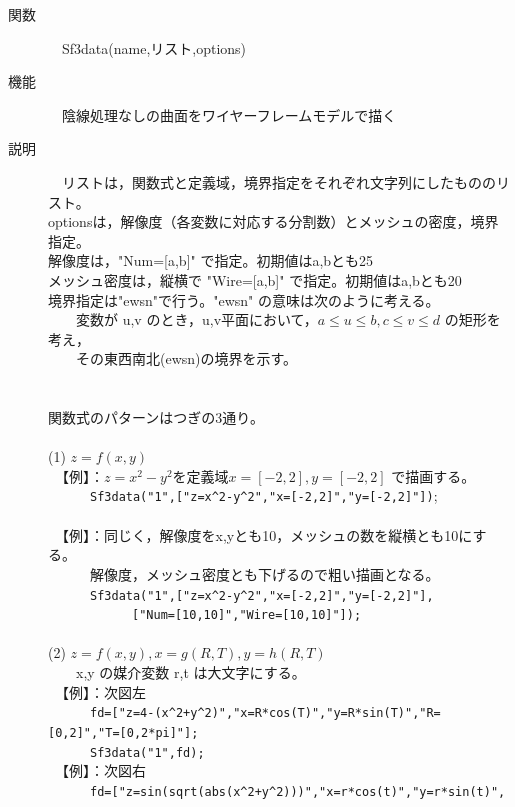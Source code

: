 \documentclass[papersize,a4paper,12pt,uplatex]{jsarticle}
\begin{document}
\begin{description}
\hypertarget{sf3data}{}
\item[関数]　Sf3data(name,リスト,options)
\item[機能]　陰線処理なしの曲面をワイヤーフレームモデルで描く
\item[説明]　リストは，関数式と定義域，境界指定をそれぞれ文字列にしたもののリスト。\\
optionsは，解像度（各変数に対応する分割数）とメッシュの密度，境界指定。\\
解像度は，"Num=[a,b]" で指定。初期値はa,bとも25\\
メッシュ密度は，縦横で "Wire=[a,b]" で指定。初期値はa,bとも20\\
境界指定は"ewsn"で行う。"ewsn" の意味は次のように考える。\\
　　変数が u,v のとき，u,v平面において，$a \leq u \leq b,c \leq v \leq d$ の矩形を考え，\\
　　その東西南北(ewsn)の境界を示す。\\
　　　　　　　　\\
　\\
関数式のパターンはつぎの3通り。\\
　\\
(1) $z=f(x,y)$\\
　【例】：$z=x^2-y^2$を定義域$x=[-2,2],y=[-2,2]$ で描画する。\\
　　　\verb|Sf3data("1",["z=x^2-y^2","x=[-2,2]","y=[-2,2]"])|;\\
　　　　　　　\\
　【例】：同じく，解像度をx,yとも10，メッシュの数を縦横とも10にする。\\
　　　解像度，メッシュ密度とも下げるので粗い描画となる。\\
　　　\verb|Sf3data("1",["z=x^2-y^2","x=[-2,2]","y=[-2,2]"],|\\
　　　　　　\verb|["Num=[10,10]","Wire=[10,10]"]);|\\
　\\
(2) $z=f(x,y),x=g(R,T),y=h(R,T)$\\
　　x,y の媒介変数 r,t は大文字にする。\\
　【例】：次図左\\
　　　\verb|fd=["z=4-(x^2+y^2)","x=R*cos(T)","y=R*sin(T)","R=[0,2]","T=[0,2*pi]"];|\\
　　　\verb|Sf3data("1",fd);|\\
　【例】：次図右\\
　　　\verb|fd=["z=sin(sqrt(abs(x^2+y^2)))","x=r*cos(t)","y=r*sin(t)",|\\

\end{description}
\end{document}
